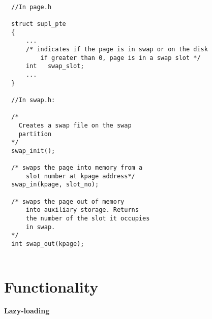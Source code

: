 \begin{lstlisting}
	
  //In page.h
  
  struct supl_pte
  {
	  ...
	  /* indicates if the page is in swap or on the disk
	      if greater than 0, page is in a swap slot */
	  int	swap_slot;
	  ...
  }
  
  //In swap.h:
  
  /*
    Creates a swap file on the swap
    partition
  */
  swap_init();
  
  /* swaps the page into memory from a
      slot number at kpage address*/
  swap_in(kpage, slot_no);
  
  /* swaps the page out of memory
      into auxiliary storage. Returns
      the number of the slot it occupies
      in swap.
  */
  int swap_out(kpage);
	
\end{lstlisting}

\section{Functionality}

\textbf{Lazy-loading}

